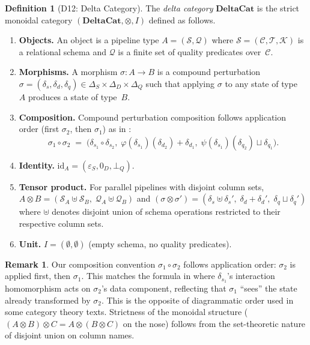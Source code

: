 \documentclass[11pt,a4paper]{article}
\theoremstyle{definition}
\newtheorem{definition}[theorem]{Definition}
\newtheorem{remark}[theorem]{Remark}
\newcommand{\DeltaS}{\Delta_{\!S}}
\newcommand{\DeltaD}{\Delta_{\!D}}
\newcommand{\DeltaQ}{\Delta_{\!Q}}
\newcommand{\epsS}{\varepsilon_S}
\newcommand{\zeroD}{0_D}
\newcommand{\botQ}{\bot_Q}
\begin{document}
\begin{definition}[D12: Delta Category]\label{def:delta-cat}
The \emph{delta category} $\mathbf{DeltaCat}$ is the strict monoidal category
$(\mathbf{DeltaCat}, \otimes, I)$ defined as follows.
\begin{enumerate}[nosep]
  \item \textbf{Objects.}  An object is a pipeline type
    $A = (\mathcal{S}, \mathcal{Q})$ where $\mathcal{S} = (\mathcal{C},
    \mathcal{T}, \mathcal{K})$ is a relational schema and $\mathcal{Q}$ is a
    finite set of quality predicates over~$\mathcal{C}$.
  \item \textbf{Morphisms.}  A morphism $\sigma\colon A \to B$ is a compound
    perturbation $\sigma = (\delta_s, \delta_d, \delta_q) \in
    \DeltaS \times \DeltaD \times \DeltaQ$ such that applying $\sigma$ to any
    state of type~$A$ produces a state of type~$B$.
  \item \textbf{Composition.}  Compound perturbation composition follows
    application order (first $\sigma_2$, then $\sigma_1$) as in :
    \[
      \sigma_1 \circ \sigma_2 \;=\;
        \bigl(\delta_{s_1} \circ \delta_{s_2},\;
        \varphi(\delta_{s_1})(\delta_{d_2}) + \delta_{d_1},\;
        \psi(\delta_{s_1})(\delta_{q_2}) \sqcup \delta_{q_1}\bigr).
    \]
  \item \textbf{Identity.}  $\mathrm{id}_A = (\epsS, \zeroD, \botQ)$.
  \item \textbf{Tensor product.}  For parallel pipelines with disjoint column
    sets, $A \otimes B = (\mathcal{S}_A \uplus \mathcal{S}_B,\;
    \mathcal{Q}_A \uplus \mathcal{Q}_B)$ and
    $(\sigma \otimes \sigma') = (\delta_s \uplus \delta_s',\;
    \delta_d + \delta_d',\; \delta_q \sqcup \delta_q')$
    where $\uplus$ denotes disjoint union of schema operations restricted to
    their respective column sets.
  \item \textbf{Unit.}  $I = (\emptyset, \emptyset)$ (empty schema, no quality
    predicates).
\end{enumerate}
\end{definition}

\begin{remark}\label{rem:composition-convention}
Our composition convention $\sigma_1 \circ \sigma_2$ follows application order:
$\sigma_2$ is applied first, then $\sigma_1$.  This matches the formula in
 where $\delta_{s_1}$'s interaction homomorphism acts on
$\sigma_2$'s data component, reflecting that $\sigma_1$ ``sees'' the state
already transformed by $\sigma_2$.  This is the opposite of diagrammatic order
used in some category theory texts.  Strictness of the monoidal structure
($(A \otimes B) \otimes C = A \otimes (B \otimes C)$ on the nose) follows from
the set-theoretic nature of disjoint union on column names.
\end{remark}
\end{document}
